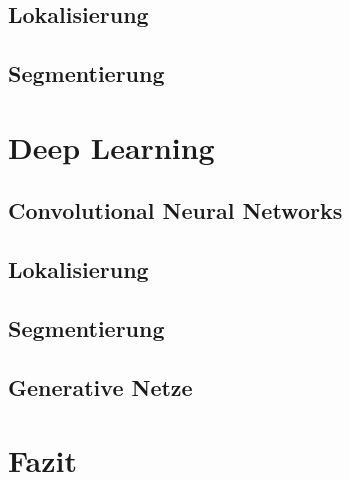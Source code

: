 \subsection{Lokalisierung}



\subsection{Segmentierung}





\section{Deep Learning}\label{sec:deep-learning}



\subsection{Convolutional Neural Networks}



\subsection{Lokalisierung}



\subsection{Segmentierung}



\subsection{Generative Netze}





\section{Fazit}


